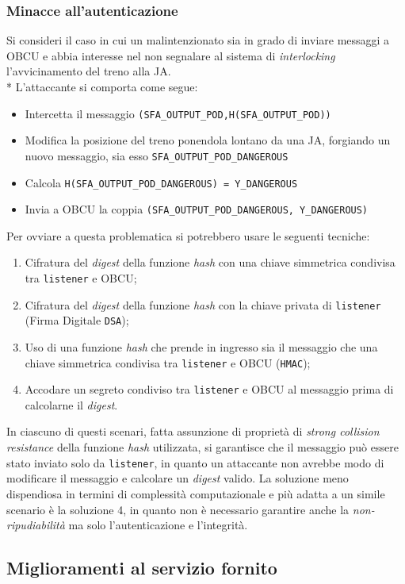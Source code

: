 \subsubsection{Minacce all'autenticazione}
Si consideri il caso in cui un malintenzionato sia in grado di inviare messaggi a OBCU e abbia interesse nel non segnalare al sistema di \emph{interlocking} l'avvicinamento del treno alla JA.\\*
L'attaccante si comporta come segue:
\begin{itemize}
	\item Intercetta il messaggio \texttt{(SFA\_OUTPUT\_POD,H(SFA\_OUTPUT\_POD))}
	\item Modifica la posizione del treno ponendola lontano da una JA, forgiando un nuovo messaggio, sia esso \texttt{SFA\_OUTPUT\_POD\_DANGEROUS}
	\item Calcola \texttt{H(SFA\_OUTPUT\_POD\_DANGEROUS) = Y\_DANGEROUS}
	\item Invia a OBCU la coppia \texttt{(SFA\_OUTPUT\_POD\_DANGEROUS, Y\_DANGEROUS)}
\end{itemize}
Per ovviare a questa problematica si potrebbero usare le seguenti tecniche:
\begin{enumerate}
	\item Cifratura del \emph{digest} della funzione \emph{hash} con una chiave simmetrica condivisa tra \texttt{listener} e OBCU;
	\item Cifratura del \emph{digest} della funzione \emph{hash} con la chiave privata di \texttt{listener} (Firma Digitale \texttt{DSA});
	\item Uso di una funzione \emph{hash} che prende in ingresso sia il messaggio che una chiave simmetrica condivisa tra \texttt{listener} e OBCU (\texttt{HMAC});
	\item Accodare un segreto condiviso tra \texttt{listener} e OBCU al messaggio prima di calcolarne il \emph{digest}.
\end{enumerate}
In ciascuno di questi scenari, fatta assunzione di propriet\`a di \emph{strong collision resistance} della funzione \emph{hash} utilizzata, si garantisce che il messaggio pu\`o essere stato inviato solo da \texttt{listener}, in quanto un attaccante non avrebbe modo di modificare il messaggio e calcolare un \emph{digest} valido. La soluzione meno dispendiosa in termini di complessit\`a computazionale e pi\`u adatta a un simile scenario \`e la soluzione 4, in quanto non \`e necessario garantire anche la \emph{non-ripudiabilit\`a} ma solo l'autenticazione e l'integrit\`a.
\subsection{Miglioramenti al servizio fornito}
